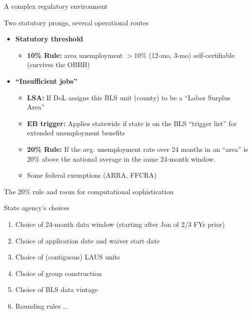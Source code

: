 \documentclass[aspectratio=169, 11pt]{beamer}
\begin{document}
\begin{frame}{A complex regulatory environment}

  \begin{block}{Two statutory prongs, several operational routes}
    \begin{itemize}
      \item \textbf{Statutory threshold}
            \begin{itemize}
              \item \textbf{10\% Rule:} area unemployment $>10\%$ (12-mo, 3-mo) self-certifiable (survives the OBBB)
            \end{itemize}
      \item \textbf{``Insufficient jobs''}
            \begin{itemize}
              \item \textbf{LSA:} If DoL assigns this BLS unit (county) to be a ``Labor Surplus Area''
              \item \textbf{EB trigger:} Applies statewide if state is on the BLS ``trigger list'' for extended unemployment benefits
              \item \textbf{20\% Rule:} If the avg. unemployment rate over 24 months in an ``area'' is $20\%$ above the national average in the same 24-month window.
              \item Some federal exemptions (ARRA, FFCRA)
            \end{itemize}
    \end{itemize}
  \end{block}

\end{frame}

\begin{frame}{The 20\% rule and room for computational sophistication}
  \begin{block}{State agency's choices}
    \begin{enumerate}
      \item Choice of 24-month data window (starting after Jan of 2/3 FYs prior)
      \item Choice of application date and waiver start date
      \item Choice of (contiguous) LAUS units
      \item Choice of group construction
      \item Choice of BLS data vintage
      \item Rounding rules \ldots
    \end{enumerate}

  \end{block}

\end{frame}
\end{document}
